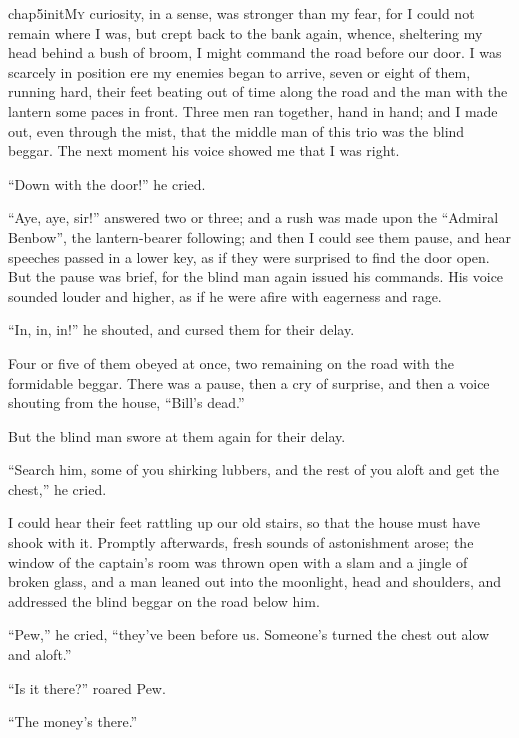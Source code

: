 
   \lettrine[lines=4,image=true]{chap5initM}{y} curiosity, in a sense, was stronger than my fear, for I could not remain where I was, but crept back to the bank again, whence, sheltering my head behind a bush of broom, I might command the road before our door. I was scarcely in position ere my enemies began to arrive, seven or eight of them, running hard, their feet beating out of time along the road and the man with the lantern some paces in front. Three men ran together, hand in hand; and I made out, even through the mist, that the middle man of this trio was the blind beggar. The next moment his voice showed me that I was right.

\enquote{Down with the door!} he cried.

\enquote{Aye, aye, sir!} answered two or three; and a rush was made upon the \enquote{Admiral Benbow}, the lantern-bearer following; and then I could see them pause, and hear speeches passed in a lower key, as if they were surprised to find the door open. But the pause was brief, for the blind man again issued his commands. His voice sounded louder and higher, as if he were afire with eagerness and rage.

\enquote{In, in, in!} he shouted, and cursed them for their delay.

Four or five of them obeyed at once, two remaining on the road with the formidable beggar. There was a pause, then a cry of surprise, and then a voice shouting from the house, \enquote{Bill’s dead.}

But the blind man swore at them again for their delay.

\enquote{Search him, some of you shirking lubbers, and the rest of you aloft and get the chest,} he cried.

I could hear their feet rattling up our old stairs, so that the house must have shook with it. Promptly afterwards, fresh sounds of astonishment arose; the window of the captain’s room was thrown open with a slam and a jingle of broken glass, and a man leaned out into the moonlight, head and shoulders, and addressed the blind beggar on the road below him.

\enquote{Pew,} he cried, \enquote{they’ve been before us. Someone’s turned the chest out alow and aloft.}

\enquote{Is it there?} roared Pew.

\enquote{The money’s there.}

